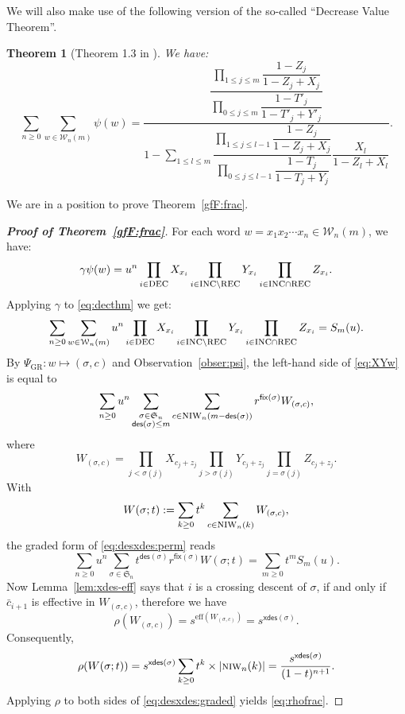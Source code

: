 \documentclass[12pt]{amsart}
\numberwithin{equation}{section}
\theoremstyle{plain}
\newtheorem{theorem}{Theorem}[section]
\theoremstyle{definition}
\def\xdes{\mathsf{xdes}}
\def\DEC{\hbox{\rm\textsc{dec}}}
\def\INC{\hbox{\rm\textsc{inc}}}
\def\REC{\hbox{\rm\textsc{rec}}}
\def\NIW{\hbox{\rm\textsc{niw}}}
\def\fix{\mathsf{fix}}
\def\des{\mathsf{des}}
\def\S{\mathfrak{S}}
\def\W{\mathcal{W}}
\def\eff{\mathrm{eff}}
\begin{document}
We will also make use of the following version of the so-called ``Decrease Value Theorem''.
\begin{theorem}[Theorem 1.3 in \cite{fh}]
We have:
\begin{equation}\label{eq:decthm}
\sum_{n\ge 0}\sum_{w\in\W_n(m)} \psi(w)
=\dfrac{\dfrac{\prod\limits_{1\le j\le m}\dfrac{1-Z_j}{1-Z_j+X_j}}{\prod\limits_{0\le j\le m}\dfrac{1-T'_j}{1-T'_j+Y'_j}}}
{1-\sum\limits_{1\le l\le m}\dfrac{\prod\limits_{1\le j\le l-1}\dfrac{1-Z_j}{1-Z_j+X_j}}{\prod\limits_{0\le j\le l-1}\dfrac{1-T_j}{1-T_j+Y_j}}\dfrac{X_l}{1-Z_l+X_l}}.
\end{equation}
\end{theorem}
We are in a position to prove Theorem~\ref{gfF:frac}.
\begin{proof}[{\bf Proof of Theorem~\ref{gfF:frac}}]
	For each word $w=x_1x_2\cdots x_n \in \W_n(m)$,
	we have:
	\begin{equation}\label{eq:gammapsiw}
		\gamma\psi(w)= 
			{\displaystyle	u^n \prod_{i\in \DEC} {X_{x_i}} \prod_{i\in \INC\setminus\REC} {Y_{x_i}} \prod_{i\in \INC \cap \REC} {Z_{x_i}} }.
	\end{equation}
	Applying $\gamma$ to \eqref{eq:decthm} we get:
	\begin{equation}\label{eq:XYw}
		\sum_{n\ge 0}\sum_{w\in\W_n(m)} u^n \prod_{i\in \DEC} {X_{x_i}} \prod_{i\in \INC\setminus\REC} {Y_{x_i}} \prod_{i\in \INC \cap \REC} {Z_{x_i}}  = 
		S_m(u).
	\end{equation}
	By $\Psi_{\mathrm{GR}}: w\mapsto (\sigma, c)$ and Observation~\ref{obser:psi}, the left-hand side of \eqref{eq:XYw} is equal to
	\begin{equation}\label{eq:desxdes:perm}
		\sum_{n\ge 0} u^n \sum_{\substack{\sigma \in \S_n \\ \des(\sigma)\leq m}}   
		\sum_{c\in \NIW_n(m-\des(\sigma))} r^{\fix(\sigma)} W_{(\sigma,c)},
	\end{equation}
	where 
	$$
	W_{(\sigma,c)} = \prod_{j<\sigma(j)} X_{c_j+z_j} \prod_{j>\sigma(j)} Y_{c_j+z_j} \prod_{j=\sigma(j)} Z_{c_j+z_j}.
	$$
	With
	$$
	W(\sigma;t) := \sum_{k\geq 0} t^k \sum_{c \in \NIW_n(k)} W_{(\sigma,c)},
	$$
	the graded form of \eqref{eq:desxdes:perm} reads
	\begin{equation}\label{eq:desxdes:graded}
		\sum_{n\geq 0} u^n \sum_{\sigma \in \S_n}   t^{\des(\sigma)} r^{\fix(\sigma)}W(\sigma;t)
		= \sum_{m\geq 0} t^m S_m(u).
	\end{equation}
	Now Lemma~\ref{lem:xdes-eff} says that $i$ is a crossing descent of $\sigma$, if and only if $\bar c_{i+1}$ is effective in $W_{(\sigma,c)}$, therefore we have
	\begin{equation}\label{eq:rhoY}	
	\rho(W_{(\sigma, c)})= s^{\eff(W_{(\sigma, c)})} = s^{\xdes(\sigma)}.
	\end{equation}	
    Consequently,
	$$
	\rho(W(\sigma;t))= s^{\xdes(\sigma)}  \sum_{k\geq 0} t^k\times |\NIW_n(k)|
	=\frac{s^{\xdes(\sigma)} }{(1-t)^{n+1}}.
	$$
	Applying $\rho$ to both sides of \eqref{eq:desxdes:graded} yields \eqref{eq:rhofrac}.
\end{proof}
\end{document}
